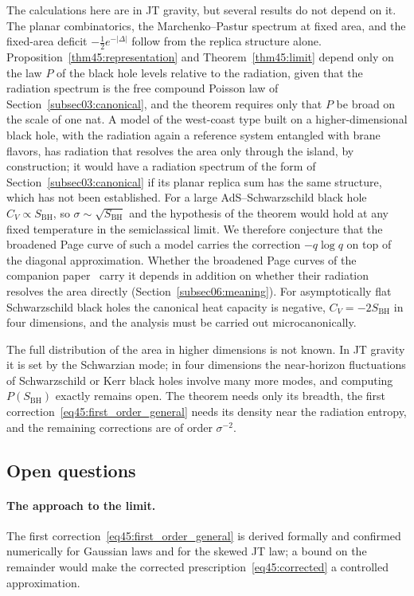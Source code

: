\documentclass[11pt,letterpaper]{article}
\theoremstyle{plain}
\theoremstyle{definition}
\theoremstyle{remark}
\begin{document}
The calculations here are in JT gravity, but several results do not depend on it. The planar combinatorics, the Marchenko--Pastur spectrum at fixed area, and the fixed-area deficit $-\tfrac12 e^{-|\Delta|}$ follow from the replica structure alone. Proposition~\ref{thm45:representation} and Theorem~\ref{thm45:limit} depend only on the law $P$ of the black hole levels relative to the radiation, given that the radiation spectrum is the free compound Poisson law of Section~\ref{subsec03:canonical}, and the theorem requires only that $P$ be broad on the scale of one nat. A model of the west-coast type built on a higher-dimensional black hole, with the radiation again a reference system entangled with brane flavors, has radiation that resolves the area only through the island, by construction; it would have a radiation spectrum of the form of Section~\ref{subsec03:canonical} if its planar replica sum has the same structure, which has not been established. For a large AdS--Schwarzschild black hole $C_V \propto S_{\mathrm{BH}}$, so $\sigma \sim \sqrt{S_{\mathrm{BH}}}$ and the hypothesis of the theorem would hold at any fixed temperature in the semiclassical limit. We therefore conjecture that the broadened Page curve of such a model carries the correction $-q\log q$ on top of the diagonal approximation. Whether the broadened Page curves of the companion paper~\citep{wuebben2026higher} carry it depends in addition on whether their radiation resolves the area directly (Section~\ref{subsec06:meaning}). For asymptotically flat Schwarzschild black holes the canonical heat capacity is negative, $C_V = -2S_{\mathrm{BH}}$ in four dimensions, and the analysis must be carried out microcanonically.

The full distribution of the area in higher dimensions is not known. In JT gravity it is set by the Schwarzian mode; in four dimensions the near-horizon fluctuations of Schwarzschild or Kerr black holes involve many more modes, and computing $P(S_{\mathrm{BH}})$ exactly remains open. The theorem needs only its breadth, the first correction~\eqref{eq45:first_order_general} needs its density near the radiation entropy, and the remaining corrections are of order $\sigma^{-2}$.

\subsection{Open questions}
\label{subsec06:open_questions}

\paragraph{The approach to the limit.} The first correction~\eqref{eq45:first_order_general} is derived formally and confirmed numerically for Gaussian laws and for the skewed JT law; a bound on the remainder would make the corrected prescription~\eqref{eq45:corrected} a controlled approximation.
\end{document}
